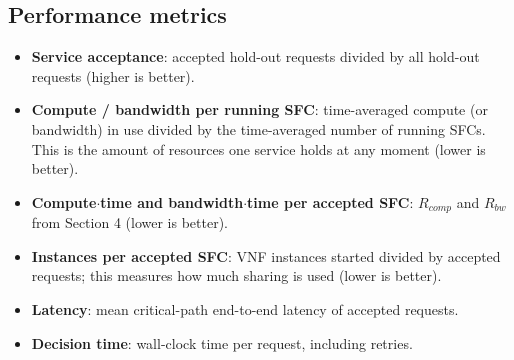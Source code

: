 \documentclass[11pt,a4paper]{article}
\begin{document}
\subsection{Performance metrics}
\begin{itemize}
  \item \textbf{Service acceptance}: accepted hold-out requests divided by all
  hold-out requests (higher is better).
  \item \textbf{Compute / bandwidth per running SFC}: time-averaged compute (or
  bandwidth) in use divided by the time-averaged number of running SFCs. This is
  the amount of resources one service holds at any moment (lower is better).
  \item \textbf{Compute$\cdot$time and bandwidth$\cdot$time per accepted SFC}:
  $R_{comp}$ and $R_{bw}$ from Section 4 (lower is better).
  \item \textbf{Instances per accepted SFC}: VNF instances started divided by
  accepted requests; this measures how much sharing is used (lower is better).
  \item \textbf{Latency}: mean critical-path end-to-end latency of accepted
  requests.
  \item \textbf{Decision time}: wall-clock time per request, including retries.
\end{itemize}
\end{document}
